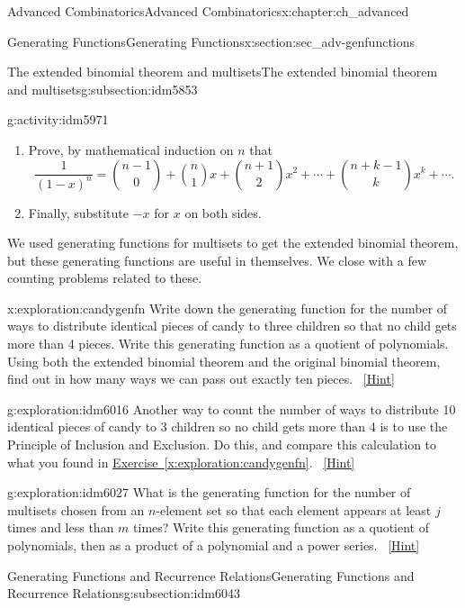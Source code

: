\documentclass[oneside,10pt,]{book}
\numberwithin{equation}{chapter}
\begin{document}
\begin{chapterptx}{Advanced Combinatorics}{}{Advanced Combinatorics}{}{}{x:chapter:ch_advanced}
\begin{sectionptx}{Generating Functions}{}{Generating Functions}{}{}{x:section:sec_adv-genfunctions}
\begin{subsectionptx}{The extended binomial theorem and multisets}{}{The extended binomial theorem and multisets}{}{}{g:subsection:idm5853}
\begin{activity}{}{g:activity:idm5971}
\begin{enumerate}[font=\bfseries,label=(\alph*),ref=\alph*]
\item{}Prove, by mathematical induction on \(n\) that%
\begin{equation*}
\frac{1}{(1-x)^{n}} = \binom{n-1}{0} + \binom{n}{1}x + \binom{n+1}{2}x^2 + \cdots + \binom{n+k-1}{k}x^k+ \cdots\text{.}
\end{equation*}
%
\item{}Finally, substitute \(-x\) for \(x\) on both sides.%
\end{enumerate}
\end{activity}
We used generating functions for multisets to get the extended binomial theorem, but these generating functions are useful in themselves.  We close with a few counting problems related to these.%
\begin{exploration}{}{x:exploration:candygenfn}%
Write down the generating function for the number of ways to distribute identical pieces of candy to three children so that no child gets more than 4 pieces. Write this generating function as a quotient of polynomials. Using both the extended binomial theorem and the original binomial theorem, find out in how many ways we can pass out exactly ten pieces.%
\qquad~\hfill{\tiny\hyperlink{g:hint:idm6000-back}{[Hint]}}\end{exploration}
\begin{exploration}{}{g:exploration:idm6016}%
Another way to count the number of ways to distribute 10 identical pieces of candy to 3 children so no child gets more than 4 is to use the Principle of Inclusion and Exclusion.  Do this, and compare this calculation to what you found in \hyperref[x:exploration:candygenfn]{Exercise~\ref{x:exploration:candygenfn}}.%
\qquad~\hfill{\tiny\hyperlink{g:hint:idm6020-back}{[Hint]}}\end{exploration}
\begin{exploration}{}{g:exploration:idm6027}%
What is the generating function for the number of multisets chosen from an \(n\)-element set so that each element appears at least \(j\) times and less than \(m\) times? Write this generating function as a quotient of polynomials, then as a product of a polynomial and a power series.%
\qquad~\hfill{\tiny\hyperlink{g:hint:idm6033-back}{[Hint]}}\end{exploration}
\end{subsectionptx}
%
%
\typeout{************************************************}
\typeout{************************************************}
%
\begin{subsectionptx}{Generating Functions and Recurrence Relations}{}{Generating Functions and Recurrence Relations}{}{}{g:subsection:idm6043}

\end{subsectionptx}
\end{sectionptx}
\end{chapterptx}
\end{document}
